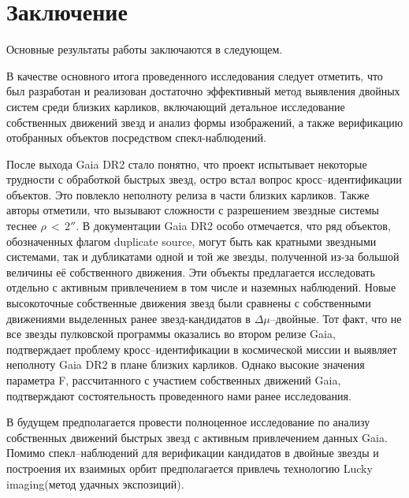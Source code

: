 \chapter*{Заключение}                       %


Основные результаты работы заключаются в следующем.

В качестве основного итога проведенного исследования следует отметить, что был разработан и реализован достаточно эффективный метод выявления двойных систем среди близких карликов, включающий детальное исследование собственных движений звезд и анализ формы изображений, а также верификацию отобранных объектов посредством спекл-наблюдений.

После выхода Gaia DR2 стало понятно, что проект испытывает некоторые трудности с обработкой быстрых звезд, остро встал вопрос кросс--идентификации объектов. Это повлекло неполноту релиза в части близких карликов. Также авторы отметили, что вызывают сложности с разрешением звездные системы теснее $\rho\,<\,2''$. В документации Gaia DR2 особо отмечается, что ряд объектов, обозначенных флагом \glqq duplicate source\grqq , могут быть как кратными звездными системами, так и дубликатами одной и той же звезды, полученной из-за большой величины её собственного движения. Эти объекты предлагается исследовать отдельно с активным привлечением в том числе и наземных наблюдений. Новые высокоточные собственные движения звезд были сравнены с собственными движениями выделенных ранее звезд-кандидатов в $\Delta\mu$--двойные. Тот факт, что не все звезды пулковской программы оказались во втором релизе Gaia, подтверждает проблему кросс--идентификации в космической миссии и выявляет неполноту Gaia DR2 в плане близких карликов. Однако высокие значения параметра F, рассчитанного с участием собственных движений Gaia, подтверждают состоятельность проведенного нами ранее исследования.

В будущем предполагается провести полноценное исследование по анализу собственных движений быстрых звезд с активным привлечением данных Gaia. Помимо спекл--наблюдений для верификации кандидатов в двойные звезды и построения их взаимных орбит предполагается привлечь технологию \glqq Lucky imaging\grqq (метод удачных экспозиций).
